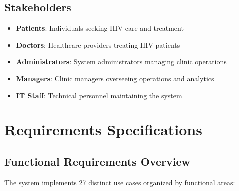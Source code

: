 \documentclass[12pt,a4paper]{article}
\begin{document}
\subsection{Stakeholders}
\begin{itemize}
    \item \textbf{Patients}: Individuals seeking HIV care and treatment
    \item \textbf{Doctors}: Healthcare providers treating HIV patients
    \item \textbf{Administrators}: System administrators managing clinic operations
    \item \textbf{Managers}: Clinic managers overseeing operations and analytics
    \item \textbf{IT Staff}: Technical personnel maintaining the system
\end{itemize}

\newpage

\section{Requirements Specifications}

\subsection{Functional Requirements Overview}

The system implements 27 distinct use cases organized by functional areas:
\end{document}
